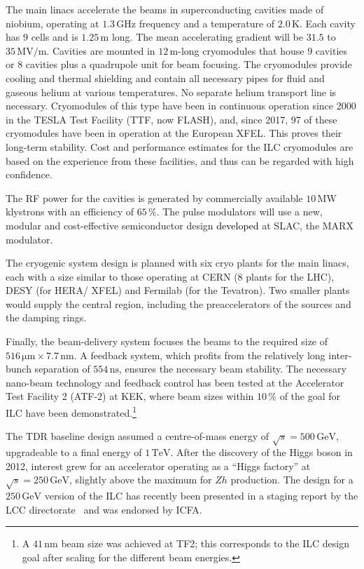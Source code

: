 \documentclass[%
 reprint,
 amsmath,amssymb,
 aps,
]{revtex4-1}
\newcommand{\jim}[1]{\textcolor{black}{#1}}
\begin{document}
The main linacs accelerate the beams in superconducting cavities made of niobium, operating at $1.3\,{\mathrm{GHz}}$ frequency and a temperature of $2.0\,{\mathrm{K}}$. 
Each cavity has $9$ cells and is $1.25\,{\mathrm{m}}$ long. 
The mean accelerating gradient will be $31.5$ to $35\,{\mathrm{MV/m}}$.
Cavities are mounted in $12\,{\mathrm{m}}$-long cryomodules that house $9$ cavities or $8$ cavities plus a quadrupole unit for beam focusing. 
The cryomodules provide cooling and thermal shielding and contain all
necessary pipes for fluid and gaseous helium at various temperatures. 
No separate helium transport line is necessary.
Cryomodules of this type have been in continuous 
operation since 2000 in the TESLA Test Facility (TTF, now FLASH), and, 
since 2017, 97 of these cryomodules have been in operation at the
European XFEL.   This proves their 
long-term stability. 
Cost and performance estimates for the ILC cryomodules are based on
the 
experience from these facilities, and thus can be regarded with high confidence. 

The RF power for the cavities is generated by commercially available $10\,{\mathrm{MW}}$ klystrons with an efficiency of $65\,\%$. 
The pulse modulators will use a new, modular and cost-effective semiconductor design \jim{developed} at SLAC, the MARX modulator.

The cryogenic system design is planned with six cryo plants for the
main linacs, each with a size similar to those operating at CERN (8
plants for the LHC), 
DESY (for HERA/ XFEL) and Fermilab (for the Tevatron).
Two smaller plants would supply the central region, including the preaccelerators of the sources and the damping rings. 

Finally, the beam-delivery system focuses the beams 
to the required size of $516\,{\mathrm{\mu m}} \times 7.7\,{\mathrm{nm}} $. 
A feedback system, which profits from the relatively long
 inter-bunch separation of $554\,{\mathrm{ns}}$, ensures the necessary beam stability. 
The necessary nano-beam technology and feedback control 
has been tested at the Accelerator
Test Facility 2 (ATF-2) at KEK, where beam sizes within $10\,\%$ of
the goal for ILC have 
been demonstrated.\footnote{A $41\,{\mathrm{nm}}$ beam size was
  achieved at TF2; this corresponds to the ILC design goal after
  scaling for the different beam energies.}
 

The TDR baseline design assumed
 a centre-of-mass energy of $\sqrt{s}=500\,{\mathrm{GeV}}$, upgradeable to a final energy of $1\,{\mathrm{TeV}}$.
After the discovery of the Higgs boson in 2012, interest 
grew for an accelerator operating as a ``Higgs factory'' at
 $\sqrt{s}=250\,{\mathrm{GeV}}$, slightly above the maximum for $Zh$ production. 
The design for a $250\,{\mathrm{GeV}}$ version of the 
ILC has recently been presented in a  staging
 report by the LCC directorate~\cite{Evans:2017rvt} and was endorsed by ICFA.
\end{document}
